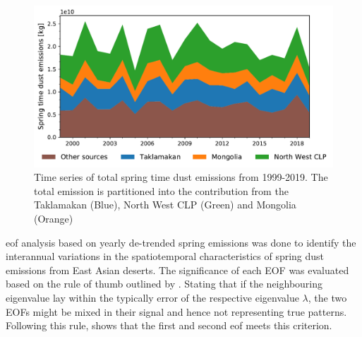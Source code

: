 \begin{figure}[htbp]
    \centering
    \includegraphics[width=\textwidth]{../figs/Emission_timeseries.pdf}
    \caption{Time series of total spring time dust emissions from 1999-2019. The total emission is partitioned into the contribution from the Taklamakan (Blue), North West CLP (Green) and Mongolia (Orange) }
    \label{fig:emission_timeseries}
\end{figure}

\acrfull{eof} analysis based on yearly de-trended spring emissions was done to identify the interannual variations in the spatiotemporal characteristics of spring dust emissions from East Asian deserts. The significance of each EOF was evaluated based on the rule of thumb outlined by \textcite{north1982sampling}. Stating that if the neighbouring eigenvalue lay within the typically error of the respective eigenvalue $\lambda$, the two EOFs might be mixed in their signal and hence not representing true patterns. Following this rule,  shows that the first and second \acrshort{eof} meets this criterion.  


